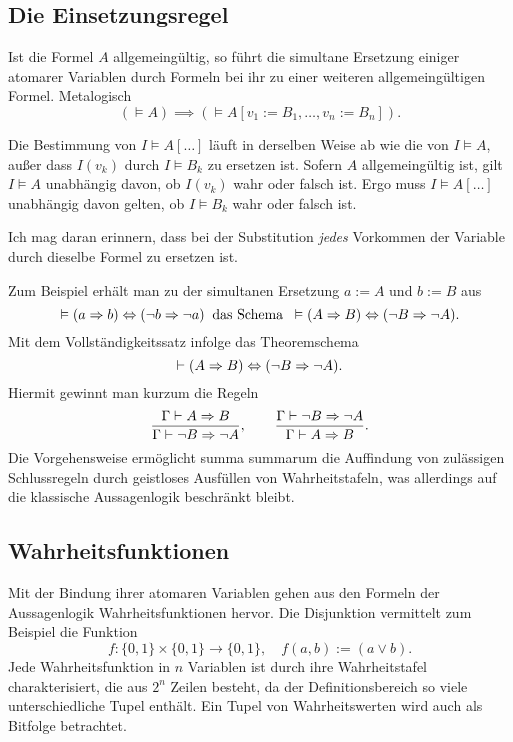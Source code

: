 \subsection{Die Einsetzungsregel}

\begin{Satz}[Einsetzungsregel]\newlinefirst
Ist die Formel $A$ allgemeingültig, so führt die simultane Ersetzung
einiger atomarer Variablen durch Formeln bei ihr zu einer weiteren
allgemeingültigen Formel. Metalogisch
\[(\models A)\implies (\models A[v_1:=B_1,\ldots,v_n:=B_n]).\]
\end{Satz}
\begin{Beweis}
Die Bestimmung von $I\models A[\ldots]$ läuft in
derselben Weise ab wie die von $I\models A$, außer dass $I(v_k)$ durch
$I\models B_k$ zu ersetzen ist. Sofern $A$ allgemeingültig ist, gilt
$I\models A$ unabhängig davon, ob $I(v_k)$ wahr oder falsch ist.
Ergo muss $I\models A[\ldots]$ unabhängig davon gelten, ob $I\models B_k$
wahr oder falsch ist.\,\qedsymbol
\end{Beweis}

\noindent
Ich mag daran erinnern, dass bei der Substitution \emph{jedes}
Vorkommen der Variable durch dieselbe Formel zu ersetzen ist.

Zum Beispiel erhält man zu der simultanen Ersetzung
$a:=A$ und $b:=B$ aus
\[\vDash (a\Rightarrow b)\Leftrightarrow (\lnot b\Rightarrow\lnot a)\;\;\text{das Schema}\;\;
\vDash (A\Rightarrow B)\Leftrightarrow (\lnot B\Rightarrow\lnot A).\]
Mit dem Vollständigkeitssatz infolge das Theoremschema
\[\vdash (A\Rightarrow B)\Leftrightarrow (\lnot B\Rightarrow\lnot A).\]
Hiermit gewinnt man kurzum die Regeln
\[\dfrac{\Gamma\vdash A\Rightarrow B}{\Gamma\vdash\lnot B\Rightarrow\lnot A},\qquad
\dfrac{\Gamma\vdash\lnot B\Rightarrow\lnot A}{\Gamma\vdash A\Rightarrow B}.\]
Die Vorgehensweise ermöglicht summa summarum die Auffindung von
zulässigen Schlussregeln durch geistloses Ausfüllen von Wahrheitstafeln,
was allerdings auf die klassische Aussagenlogik beschränkt bleibt.

\subsection{Wahrheitsfunktionen}

Mit der Bindung ihrer atomaren Variablen gehen aus den Formeln der
Aussagenlogik Wahrheitsfunktionen hervor. Die Disjunktion vermittelt
zum Beispiel die Funktion%
\[f\colon\{0,1\}\times\{0,1\}\to\{0,1\},\quad f(a,b):=(a\lor b).\]
Jede Wahrheitsfunktion in $n$ Variablen ist durch ihre Wahrheitstafel
charakterisiert, die aus $2^n$ Zeilen besteht, da der Definitionsbereich
so viele unterschiedliche Tupel enthält. Ein Tupel von Wahrheitswerten
wird auch als Bitfolge betrachtet.

